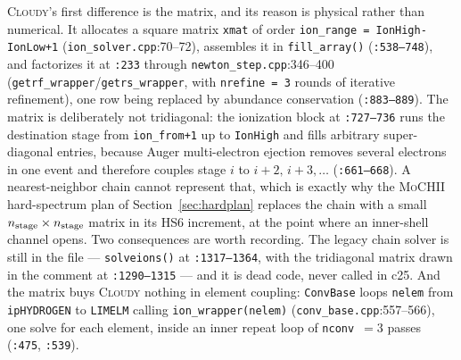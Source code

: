 \documentclass[english,a4paper]{my_memo}
\newcommand{\code}[1]{\texttt{#1}}
\newcommand{\MoCHII}{\textsc{MoCHII}}
\newcommand{\Cloudy}{\textsc{Cloudy}}
\begin{document}
\Cloudy{}'s first difference is the matrix, and its reason is physical rather
than numerical.  It allocates a square matrix \code{xmat} of order
\code{ion\_range = IonHigh-IonLow+1} (\code{ion\_solver.cpp}:70--72),
assembles it in \code{fill\_array()} (\code{:538--748}), and factorizes it at
\code{:233} through \code{newton\_step.cpp}:346--400
(\code{getrf\_wrapper}/\code{getrs\_wrapper}, with \code{nrefine = 3} rounds
of iterative refinement), one row being replaced by abundance conservation
(\code{:883--889}).  The matrix is deliberately not tridiagonal: the
ionization block at \code{:727--736} runs the destination stage from
\code{ion\_from+1} up to \code{IonHigh} and fills arbitrary super-diagonal
entries, because Auger multi-electron ejection removes several electrons in
one event and therefore couples stage $i$ to $i+2,\,i+3,\dots$
(\code{:661--668}).  A nearest-neighbor chain cannot represent that, which is
exactly why the \MoCHII{} hard-spectrum plan of Section~\ref{sec:hardplan}
replaces the chain with a small $n_{\rm stage}\times n_{\rm stage}$ matrix in
its HS6 increment, at the point where an inner-shell channel opens.  Two
consequences are worth recording.  The legacy chain solver is still in the
file --- \code{solveions()} at \code{:1317--1364}, with the tridiagonal
matrix drawn in the comment at \code{:1290--1315} --- and it is dead code,
never called in c25.  And the matrix buys \Cloudy{} nothing in element
coupling: \code{ConvBase} loops \code{nelem} from \code{ipHYDROGEN} to
\code{LIMELM} calling \code{ion\_wrapper(nelem)}
(\code{conv\_base.cpp}:557--566), one solve for each element, inside an inner
repeat loop of \code{nconv}~$=3$ passes (\code{:475}, \code{:539}).
\end{document}
